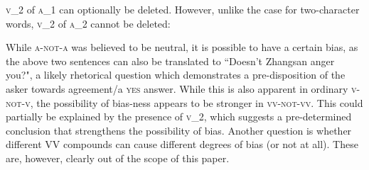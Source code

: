 \documentclass[12pt, UTF8]{article}
\begin{document}
\textsc{v_2} of \textsc{a_1} can optionally be deleted. However, unlike the case for two-character words, \textsc{v_2} of \textsc{a_2} cannot be deleted:

\begin{exe}


\end{exe}


%
%
%
%

While \textsc{a-not-a} was believed to be neutral, it is possible to have a certain bias, as the above two sentences can also be translated to ``Doesn't Zhangsan anger you?", a likely rhetorical question which demonstrates a pre-disposition of the asker towards agreement/a \textsc{yes} answer. 
While this is also apparent in ordinary \textsc{v-not-v}, the possibility of bias-ness appears to be stronger in \textsc{vv-not-vv}. This could partially be explained by the presence of \textsc{v_2}, which suggests a pre-determined conclusion that strengthens the possibility of bias. Another question is whether different VV compounds can cause different degrees of bias (or not at all). These are, however, clearly out of the scope of this paper. 


%



%
%
%
\end{document}

